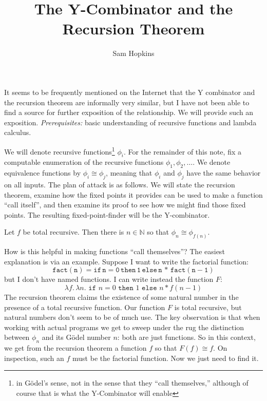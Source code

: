 \documentclass{article}
\title{The Y-Combinator and the Recursion Theorem}
\author{Sam Hopkins}
\begin{document}
\fancyheadoffset[LE,RO]{0pt}{\marginparsep + \marginparwidth}
\maketitle
It seems to be frequently mentioned on the Internet that the Y combinator and
the recursion theorem are informally very similar, but I have not been able to
find a source for further exposition of the relationship. We will provide such
an exposition. \emph{Prerequisites:} basic understanding of recursive functions
and lambda calculus.

We will denote recursive functions\footnote{in G\"odel's sense, not in the sense that
they ``call themselves,'' although of course that is what the Y-Combinator will
enable} $\phi_i$. For the remainder of this note, fix a computable enumeration
of the recursive functions $\phi_1, \phi_2, \ldots$. We denote equivalence
functions by $\phi_i \cong \phi_j$, meaning that $\phi_i$ and $\phi_j$ have
the same behavior on all inputs. The plan of attack is as follows. We will state
the recursion theorem, examine how the fixed points it provides can be used to
make a function ``call itself'', and then examine its proof to see how we might
find those fixed points. The resulting fixed-point-finder will be the
Y-combinator.
\begin{thmnonum} Let $f$ be total recursive. Then there is $n
  \in \mathbb{N}$ so that $\phi_n \cong \phi_{f(n)}$. 
\end{thmnonum}
How is this helpful in making functions ``call themselves''? The easiest
explanation is via an example. Suppose I want to write the factorial function:
\[
  \mathtt{fact(n) = if \, n = 0 \, then \, 1 \, else \, n \, * \, fact(n - 1)}
\]
but I don't have named functions. I can write instead the function $F$:
\[
  \lambda f. \, \lambda n. \,\, \mathtt{if} \,\, n = 0 \, \, \mathtt{then} \, \,
  1 \,\,
  \mathtt{else} \, \, n * f(n - 1)
\]
The recursion theorem claims the existence of some natural number in the
presence of a total recursive function. Our function $F$ is total recursive, but
natural numbers don't seem to be of much use. The key observation is that when
working with actual programs we get to sweep under the rug the distinction
between $\phi_n$ and its G\"odel number $n$: both are just functions. So
in this context, we get from the recursion theorem a function $f$ so that $F(f)
\cong f$. On inspection, such an $f$ must be the factorial function. Now we
just need to find it.
\end{document}
